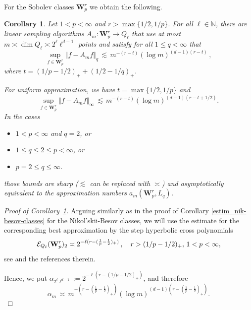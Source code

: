 \documentclass[a4paper,12pt]{amsart}
\newtheorem{corollary}[theorem]{Corollary}
\theoremstyle{definition}
\theoremstyle{remark}
\newcommand{\abs}[1]{\left|#1\right|}
\begin{document}
{\medskip




For the Sobolev classes $\mathbf{W}^r_p$
we obtain the following.

\begin{corollary}\label{estim_Sobolev_classes}
Let $1< p <\infty$ and $r>\max \{1/2, 1/p\}$. For all $\ell\in\mathbb{N}$, there are linear sampling algorithms $A_m \colon \mathbf{W}^r_p \to Q_\ell$ 
that use at most $m \asymp \dim Q_\ell \asymp 2^\ell \ell^{d-1}$ points and
	satisfy
for all
$1\leq q < \infty$ that
$$
\sup_{f\in{\mathbf{W}^r_p}}\Vert f - A_m f  \Vert_q
	\,\lesssim\, m^{ -(  r-t)} 
(\log m)^{(d-1)(r-t) }\,,
	$$
where $t=(1/p-1/2)_+ +(1/2-1/q)_+$.

For uniform approximation, we have $t=\max\{1/2,1/p\}$ and
\[
 \sup_{f\in{\mathbf{W}^r_p}}\Vert f - A_m f  \Vert_\infty 
 \,\lesssim\, m^{ -( r-t)} (\log m)^{(d-1)(r-t+1/2)}.
\]
{In the cases}
\begin{itemize}
    \item $1<p <\infty$ and $q=2$, or
    \item $1\leq q \leq2\leq p < \infty$, or
    \item {$p=2\leq q \le \infty$}.
\end{itemize}
those bounds are sharp {($\lesssim$ can be replaced with $\asymp$) } and 
{asymptotically equivalent to the approximation numbers $a_m(\mathbf{W}^r_p, L_q)$.}
\end{corollary}



\begin{proof}[Proof of Corollary~\ref{estim_Sobolev_classes}]


Arguing similarly 
as in the proof of
Corollary \ref{estim_nik-besov-classes} for the Nikol'skii-Besov classes, we will use the estimate for the corresponding best approximation by the step hyperbolic cross polynomials 
$$
{\mathcal{E}_{Q_
\ell}
}(\mathbf{W}^r_p)_2 \asymp 2^{-
{\ell}
(r-(\frac{1}{p}-\frac{1}{2})_+)} \,, \quad r>
{(1/p-1/2)_+,}
\ 1< p <\infty,
$$
see \cite[Thm. 4.2.4]{DTU18} and the references therein.
 
Hence, we put $\alpha_{2^{\ell} {\ell}^{d-1}} := 2^{-{\ell} (r-(1/p-1/2)_+)}$,
and therefore
$$\alpha_m \,\asymp\, m^{ -( r-(\frac{1}{p}-\frac{1}{2})_+)} (\log m)^{(d-1)(r-(\frac{1}{p}-\frac{1}{2})_+)}.$$


\end{proof}}
\end{document}
